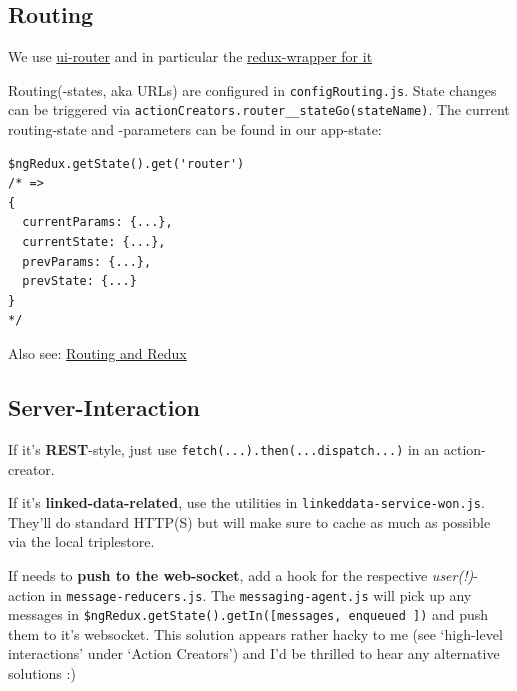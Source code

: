 
\subsection{Routing}\label{routing}

We use
\href{https://github.com/angular-ui/ui-router/wiki/Quick-Reference}{ui-router}
and in particular the
\href{https://github.com/neilff/redux-ui-router}{redux-wrapper for it}

Routing(-states, aka URLs) are configured in \texttt{configRouting.js}. %
State changes can be triggered via
\texttt{actionCreators.router\_\_stateGo(stateName)}. %
The current
routing-state and -parameters can be found in our app-state:

\begin{verbatim}
$ngRedux.getState().get('router')
/* =>
{
  currentParams: {...},
  currentState: {...},
  prevParams: {...},
  prevState: {...}
}
*/
\end{verbatim}

Also see:
\href{https://github.com/researchstudio-sat/webofneeds/issues/344}{Routing
and Redux} %

\subsection{Server-Interaction}\label{server-interaction}

If it's \textbf{REST}-style, just use
\texttt{fetch(...).then(...dispatch...)} in an action-creator.

If it's \textbf{linked-data-related}, use the utilities in
\texttt{linkeddata-service-won.js}. They'll do standard HTTP(S) but will
make sure to cache as much as possible via the local triplestore.

If needs to \textbf{push to the web-socket}, add a hook for the
respective \emph{user(!)}-action in \texttt{message-reducers.js}. The
\texttt{messaging-agent.js} will pick up any messages in
\texttt{\$ngRedux.getState().getIn({[\textquotesingle{}messages\textquotesingle{},
\textquotesingle{}enqueued\textquotesingle{}  ]})}
and push them to it's websocket. This solution appears rather hacky to
me (see `high-level interactions' under `Action Creators') and I'd be
thrilled to hear any alternative solutions :)

